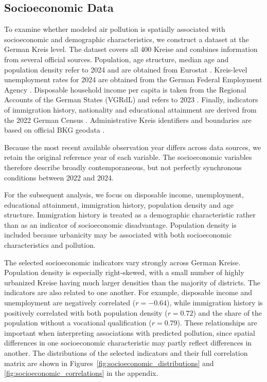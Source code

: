 \documentclass[english, a4paper]{article}
\begin{document}


\subsection{Socioeconomic Data}

To examine whether modeled air pollution is spatially associated with
socioeconomic and demographic characteristics, we construct a dataset at the
German Kreis level. The dataset covers all 400 Kreise and combines information
from several official sources. Population, age structure, median age and
population density refer to 2024 and are obtained from Eurostat
\citep{eurostat_pjanaggr3,eurostat_pjanind3,eurostat_d3dens}. Kreis-level
unemployment rates for 2024 are obtained from the German Federal Employment
Agency \citep{ba_arbeitslosenquoten2024}. Disposable household income per capita is taken from the Regional
Accounts of the German States (VGRdL) and refers to 2023 \citep{vgrdl_r2b3_2023}. Finally, indicators
of immigration history, nationality and educational attainment are derived
from the 2022 German Census \citep{zensus2022_demografie,zensus2022_bildung}. Administrative Kreis identifiers and boundaries
are based on official BKG geodata \citep{bkg_vg250_2024}.

Because the most recent available observation year differs across data
sources, we retain the original reference year of each variable. The socioeconomic variables
therefore describe broadly contemporaneous, but not perfectly synchronous
conditions between 2022 and 2024.

For the subsequent analysis, we focus on disposable income, unemployment,
educational attainment, immigration history, population density and age
structure. Immigration history is treated as a demographic characteristic
rather than as an indicator of socioeconomic disadvantage. Population density
is included because urbanicity may be associated with both socioeconomic
characteristics and pollution.

The selected socioeconomic indicators vary strongly across German Kreise.
Population density is especially right-skewed, with a small number of highly
urbanized Kreise having much larger densities than the majority of districts.
The indicators are also related to one another. For example, disposable income
and unemployment are negatively correlated ($r=-0.64$), while immigration
history is positively correlated with both population density ($r=0.72$) and
the share of the population without a vocational qualification ($r=0.79$).
These relationships are important when interpreting associations with
predicted pollution, since spatial differences in one socioeconomic
characteristic may partly reflect differences in another. The distributions
of the selected indicators and their full correlation matrix are shown in
Figures~\ref{fig:socioeconomic_distributions} and
\ref{fig:socioeconomic_correlations} in the appendix.
\end{document}
